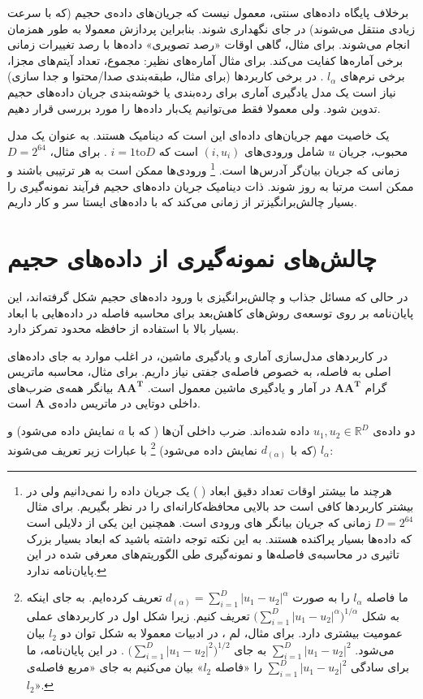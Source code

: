 برخلاف پایگاه‌ داده‌های سنتی، معمول نیست که جریان‌های داده‌ی حجیم (که با سرعت زیادی منتقل می‌شوند) در جای نگهداری شوند. بنابراین پردازش معمولا به طور همزمان انجام می‌شوند. برای مثال، گاهی اوقات «رصد تصویری» داده‌ها با رصد تغییرات زمانی برخی آماره‌ها کفایت می‌کند. برای مثال آماره‌های نظیر: مجموع، تعداد آیتم‌های مجزا، برخی نرم‌های 
$l_\alpha$
. در برخی کاربردها (برای مثال، طبقه‌بندی صدا/محتوا و جدا سازی) نیاز است یک مدل یادگیری آماری برای رده‌بندی%
یا خوشه‌بندی%
جریان داده‌های حجیم تدوین شود. ولی معمولا فقط می‌توانیم یک‌بار داده‌ها را مورد بررسی قرار دهیم.

یک خاصیت مهم جریان‌های داده‌ای این است که دینامیک هستند. به عنوان یک مدل محبوب، جریان 
$u$
شامل ورودی‌های 
$(i, u_i)$
است که 
$i = 1 \mathrm{to} D$
. برای مثال،
$D = 2^{64}$
زمانی که جریان بیان‌گر 
آدرس‌ها است.%
\footnote{
هرچند ما بیشتر اوقات تعداد دقیق ابعاد (
) یک جریان داده را نمی‌دانیم ولی در بیشتر کاربردها کافی است حد بالایی محافظه‌کارانه‌ای را در نظر بگیریم. برای مثال 
$D = 2^{64}$
زمانی که جریان بیانگر 
های ورودی است. همچنین این یکی از دلایلی است که داده‌ها بسیار پراکنده هستند. به این نکته توجه داشته باشید که ابعاد بسیار بزرک تاثیری در محاسبه‌ی فاصله‌ها و نمونه‌گیری طی الگوریتم‌های معرفی شده در این پایان‌نامه ندارد.
}
ورودی‌ها ممکن است به هر ترتیبی باشند و ممکن است مرتبا به روز شوند. ذات دینامیک جریان داده‌های حجیم فرآیند نمونه‌گیری را بسیار چالش‌برانگیزتر از زمانی ‌می‌کند که با داده‌های ایستا سر و کار داریم.

\section{
چالش‌های نمونه‌گیری از داده‌های حجیم
}

در حالی که مسائل جذاب و چالش‌برانگیزی با ورود داده‌های حجیم شکل گرفته‌اند، این پایان‌نامه بر روی توسعه‌ی روش‌های کاهش‌بعد برای محاسبه فاصله در داده‌هایی با ابعاد بسیار بالا با استفاده از حافظه محدود تمرکز دارد.

در کاربردهای مدل‌سازی آماری و یادگیری ماشین، در اغلب موارد به جای داده‌های اصلی به فاصله، به خصوص فاصله‌ی جفتی نیاز داریم. برای مثال، محاسبه ماتریس گرام%
$\mathbf{AA^T}$
در آمار و یادگیری ماشین معمول است. 
$\mathbf{AA^T}$
بیانگر همه‌ی ضرب‌های داخلی دوتایی در ماتریس داده‌ی 
‌$\mathbf{A}$
است.

دو داده‌ی 
$u_1, u_2 \in \mathbb{R}^D$
داده شده‌اند. ضرب داخلی آن‌ها ( که با 
$a$
نمایش داده می‌شود) و 
$l_\alpha$
(که با 
$d_{(\alpha)}$
نمایش داده می‌شود)%
\footnote{
ما فاصله $l_\alpha$ را به صورت 
$d_{(\alpha)} = \sum_{i=1}^{D} \mathopen| u_1 - u_2 \mathclose|^\alpha$
تعریف کرده‌ایم. به جای اینکه به شکل
$\mathopen( \sum_{i=1}^{D} \mathopen| u_1 - u_2 \mathclose|^\alpha \mathclose)^{1/\alpha}$
تعریف کنیم. زیرا شکل اول در کاربردهای عملی عمومیت بیشتری دارد. برای مثال، لم 
، در ادبیات معمولا به شکل توان دو $l_2$ بیان می‌شود. 
$\sum_{i=1}^{D} \mathopen| u_1 - u_2 \mathclose|^2$
به جای 
$\mathopen( \sum_{i=1}^{D} \mathopen| u_1 - u_2 \mathclose|^2 \mathclose)^{1/2}$
. در این پایان‌نامه، ما برای سادگی 
$\sum_{i=1}^{D} \mathopen| u_1 - u_2 \mathclose|^2$
را «فاصله $l_2$» بیان می‌کنیم به جای «مربع فاصله‌ی $l_2$».
}
 با عبارات زیر تعریف می‌شوند:


